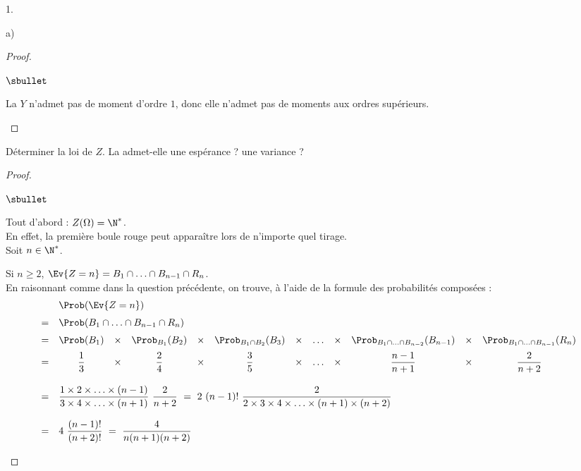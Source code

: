 \documentclass[11pt]{article}%
\begin{document}
\begin{noliste}{1.}
\begin{noliste}{a)}
\begin{proof}
\begin{noliste}{$\sbullet$}
      \item La \var $Y$ n'admet pas de moment d'ordre $1$, donc elle
        n'admet pas de moments aux ordres supérieurs. %
        ~\\[-1.2cm]
      \end{noliste}
    \end{proof}
  \end{noliste}

\item Déterminer la loi de $Z$. La \var admet-elle une espérance ? une
  variance ?
 
  \begin{proof}~    
    \begin{noliste}{$\sbullet$}
    \item Tout d'abord : $Z(\Omega) = \N^*$.\\
      En effet, la première boule rouge peut apparaître lors de
      n'importe quel tirage.\\
      Soit $n \in \N^*$.
    \item Si $n \geq 2$, $\Ev{Z = n} = B_1 \cap \ldots \cap B_{n-1}
      \cap R_n$.\\
      En raisonnant comme dans la question précédente, on trouve, à
      l'aide de la formule des probabilités composées :
      \[
      \begin{array}{cccccccccccc}
        & \multicolumn{11}{l}{\Prob(\Ev{Z = n})} \\[.2cm]
        = & \multicolumn{11}{l}{\Prob(B_1 \cap \ldots \cap B_{n-1}
          \cap R_n)} \\[.2cm] 
        = & \Prob(B_1) & \times & \Prob_{B_1}(B_2) & \times & \Prob_{B_1
          \cap B_2}(B_3) & \times & \ldots & \times & \Prob_{B_1 \cap 
	  \ldots
          \cap B_{n-2}}(B_{n-1}) & \times & \Prob_{B_1 \cap \ldots \cap
          B_{n-1}}(R_n) \\[.2cm]
        = & \dfrac{1}{3} & \times & \dfrac{2}{4} & \times & 
        \dfrac{3}{5} & \times & \ldots & \times & \dfrac{n-1}{n+1} & 
	\times &
        \dfrac{2}{n+2} \\[.6cm]
        = & \multicolumn{11}{l}{
          \dfrac{1 \times 2 \times \ldots \times
            (n-1)}{3 \times 4 \times \ldots \times (n+1)} \
          \dfrac{2}{n+2} \ = \ 2 \ (n-1)! \ \dfrac{2}{2 \times 3
            \times 4 \times \ldots \times (n+1) \times (n+2)}  
        } \\[.6cm]
        = & \multicolumn{11}{l}{
          4 \ \dfrac{(n-1)!}{(n+2)!} \ = \ \dfrac{4}{n(n+1)(n+2)}
        }
      \end{array}         
      \]
      

\end{noliste}
\end{proof}
\end{noliste}
\end{document}
